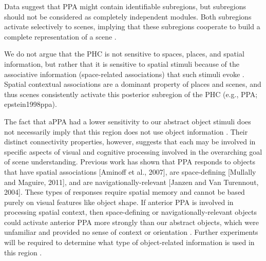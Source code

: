 \documentclass[english]{article}
\begin{document}
Data suggest that PPA might contain identifiable subregions, but subregions
should not be considered as completely independent modules.
%
Both subregions activate selectively to scenes, implying that these subregions
cooperate to build a complete representation of a scene
\citep{baldassano2013differential}.

We do not argue that the PHC is not sensitive to spaces, places, and spatial
information, but rather that it is sensitive to spatial stimuli because of the
associative information (space-related associations) that such stimuli evoke
\citep{aminoff2013role}.
Spatial contextual associations are a dominant property of places and scenes,
and thus scenes consistently activate this posterior subregion of the PHC (e.g.,
PPA; epstein1998ppa)\citep{aminoff2013role}.

The fact that aPPA had a lower sensitivity to our abstract object stimuli does
not necessarily imply that this region does not use object information
\citep{baldassano2013differential}.
Their distinct connectivity properties, however, suggests that each may be
involved in specific aspects of visual and cognitive processing involved in the
overarching goal of scene understanding.
%
Previous work has shown that PPA responds to objects that have spatial
associations [Aminoff et al., 2007], are space-defining [Mullally and Maguire,
2011], and are navigationally-relevant [Janzen and Van Turennout, 2004]. These
types of responses require spatial memory and cannot be based purely on visual
features like object shape.
%
If anterior PPA is involved in processing spatial context, then space-defining
or navigationally-relevant objects could activate anterior PPA more strongly
than our abstract objects, which were unfamiliar and provided no sense of
context or orientation \citep{baldassano2013differential}. Further experiments
will be required to determine what type of object-related information is used in
this region \citep{baldassano2013differential}.
\end{document}
